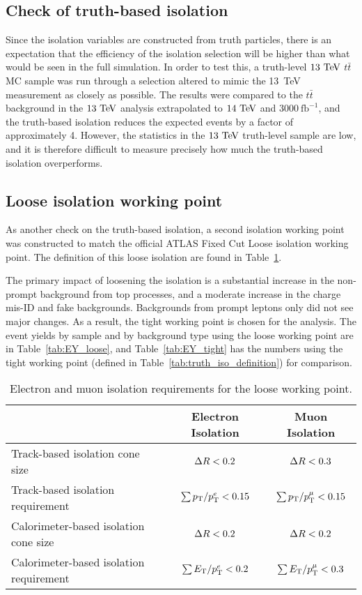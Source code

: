 \subsection{Check of truth-based isolation}
Since the isolation variables are constructed from truth particles, there is an expectation that the efficiency of the isolation selection will be higher than what would be seen in the full simulation.
In order to test this, a truth-level $13\tev$ $t\bar{t}$ MC sample was run through a selection altered to mimic the 13~TeV \ssww measurement as closely as possible.
The results were compared to the $t\bar{t}$ background in the $13\tev$ analysis extrapolated to $14\tev$ and $3000~\textrm{fb}^{-1}$, and the truth-based isolation reduces the expected events by a factor of approximately 4.
However, the statistics in the $13\tev$ truth-level sample are low, and it is therefore difficult to measure precisely how much the truth-based isolation overperforms.

\subsection{Loose isolation working point}
As another check on the truth-based isolation, a second isolation working point was constructed to match the official ATLAS Fixed Cut Loose isolation working point.
The definition of this loose isolation are found in Table~\ref{tab:isolation_cuts_loose}.

The primary impact of loosening the isolation is a substantial increase in the non-prompt background from top processes, and a moderate increase in the charge mis-ID and fake backgrounds.
Backgrounds from prompt leptons only did not see major changes.
As a result, the tight working point is chosen for the analysis.
The event yields by sample and by background type using the loose working point are in Table~\ref{tab:EY_loose}, and Table~\ref{tab:EY_tight} has the numbers using the tight working point (defined in Table~\ref{tab:truth_iso_definition}) for comparison.

\begin{table}[htbp]\renewcommand{\arraystretch}{1.2}
  \begin{center}
  \begin{tabular}{l|c|c}
    \hline\hline
				~               &   Electron Isolation & Muon Isolation \\
\hline\hline
Track-based isolation cone size   		&   $\Delta R < 0.2$         & $\Delta R < 0.3$ \\
Track-based isolation requirement    		&   $\sum p_{\mathrm{T}}/p_{\mathrm{T}}^{e} < 0.15$ & $\sum p_{\mathrm{T}}/p_{\mathrm{T}}^{\mu} < 0.15$ \\
Calorimeter-based isolation cone size   	&   $\Delta R < 0.2$	    & $\Delta R < 0.2$\\
Calorimeter-based isolation requirement    	&   $\sum E_{\mathrm{T}}/p_{\mathrm{T}}^{e} <  0.2$ & $\sum E_{\mathrm{T}}/p_{\mathrm{T}}^{\mu} <  0.3$	\\
\hline
 \end{tabular}
  \end{center}
  \caption{Electron and muon isolation requirements for the loose working point.} 
  \label{tab:isolation_cuts_loose}
\end{table}




\FloatBarrier
